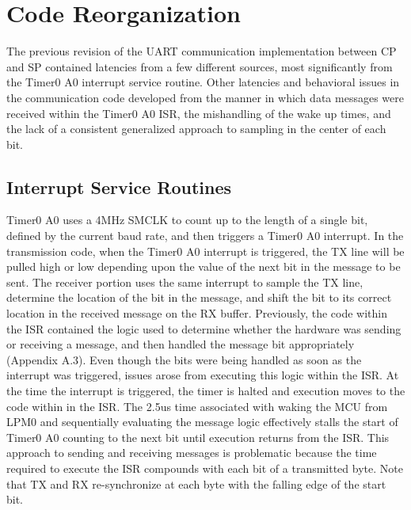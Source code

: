 \documentclass{article}
\begin{document}
\section{Code Reorganization}
The previous revision of the UART communication implementation between CP and SP contained latencies from a few different sources, most significantly from the Timer0 A0 interrupt service routine. Other latencies and behavioral issues in the communication code developed from the manner in which data messages were received within the Timer0 A0 ISR, the mishandling of the wake up times, and the lack of a consistent generalized approach to sampling in the center of each bit.   

\subsection{Interrupt Service Routines}
Timer0 A0 uses a 4MHz SMCLK to count up to the length of a single bit, defined by the current baud rate, and then triggers a Timer0 A0 interrupt. In the transmission code, when the Timer0 A0 interrupt is triggered, the TX line will be pulled high or low depending upon the value of the next bit in the message to be sent. The receiver portion uses the same interrupt to sample the TX line, determine the location of the bit in the message, and shift the bit to its correct location in the received message on the RX buffer. Previously, the code within the ISR contained the logic used to determine whether the hardware was sending or receiving a message, and then handled the message bit appropriately (Appendix A.3). Even though the bits were being handled as soon as the interrupt was triggered, issues arose from executing this logic within the ISR. At the time the interrupt is triggered, the timer is halted and execution moves to the code within in the ISR. The 2.5us time associated with waking the MCU from LPM0 and sequentially evaluating the message logic effectively stalls the start of Timer0 A0 counting to the next bit until execution returns from the ISR. This approach to sending and receiving messages is problematic because the time required to execute the ISR compounds with each bit of a transmitted byte. Note that TX and RX re-synchronize at each byte with the falling edge of the start bit.
\\\\
\end{document}
